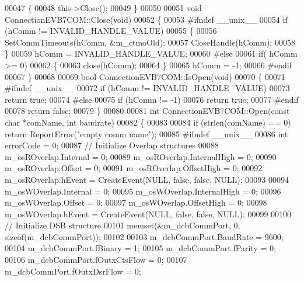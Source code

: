 \begin{DoxyCode}
00047 \{
00048     this->Close();
00049 \}
00050 
00051 \textcolor{keywordtype}{void} ConnectionEVB7COM::Close(\textcolor{keywordtype}{void})
00052 \{
00053 \textcolor{preprocessor}{#ifndef \_\_unix\_\_}
00054     \textcolor{keywordflow}{if} (hComm != INVALID\_HANDLE\_VALUE)
00055     \{
00056         SetCommTimeouts(hComm, &m_ctmoOld);
00057         CloseHandle(hComm);
00058     \}
00059     hComm = INVALID\_HANDLE\_VALUE;
00060 \textcolor{preprocessor}{#else}
00061     \textcolor{keywordflow}{if}( hComm >= 0)
00062     \{
00063         close(hComm);
00064     \}
00065     hComm = -1;
00066 \textcolor{preprocessor}{#endif}
00067 \}
00068 
00069 \textcolor{keywordtype}{bool} ConnectionEVB7COM::IsOpen(\textcolor{keywordtype}{void})
00070 \{
00071 \textcolor{preprocessor}{#ifndef \_\_unix\_\_}
00072     \textcolor{keywordflow}{if} (hComm != INVALID\_HANDLE\_VALUE)
00073         \textcolor{keywordflow}{return} \textcolor{keyword}{true};
00074 \textcolor{preprocessor}{#else}
00075     \textcolor{keywordflow}{if} (hComm != -1)
00076         \textcolor{keywordflow}{return} \textcolor{keyword}{true};
00077 \textcolor{preprocessor}{#endif}
00078     \textcolor{keywordflow}{return} \textcolor{keyword}{false};
00079 \}
00080 
00081 \textcolor{keywordtype}{int} ConnectionEVB7COM::Open(\textcolor{keyword}{const} \textcolor{keywordtype}{char} *comName, \textcolor{keywordtype}{int} baudrate)
00082 \{
00083 
00084     \textcolor{keywordflow}{if} (strlen(comName) == 0) \textcolor{keywordflow}{return} ReportError(\textcolor{stringliteral}{"empty comm name"});
00085 \textcolor{preprocessor}{#ifndef \_\_unix\_\_}
00086     \textcolor{keywordtype}{int} errorCode = 0;
00087     \textcolor{comment}{// Initialize Overlap structures}
00088     m_osROverlap.Internal = 0;
00089     m_osROverlap.InternalHigh = 0;
00090     m_osROverlap.Offset = 0;
00091     m_osROverlap.OffsetHigh = 0;
00092     m_osROverlap.hEvent = CreateEvent(NULL, \textcolor{keyword}{false}, \textcolor{keyword}{false}, NULL);
00093 
00094     m_osWOverlap.Internal = 0;
00095     m_osWOverlap.InternalHigh = 0;
00096     m_osWOverlap.Offset = 0;
00097     m_osWOverlap.OffsetHigh = 0;
00098     m_osWOverlap.hEvent = CreateEvent(NULL, \textcolor{keyword}{false}, \textcolor{keyword}{false}, NULL);
00099 
00100     \textcolor{comment}{// Initialize DSB structure}
00101     memset(&m_dcbCommPort, 0, \textcolor{keyword}{sizeof}(m_dcbCommPort));
00102 
00103     m_dcbCommPort.BaudRate = 9600;
00104     m_dcbCommPort.fBinary = 1;
00105     m_dcbCommPort.fParity = 0;
00106     m_dcbCommPort.fOutxCtsFlow = 0;
00107     m_dcbCommPort.fOutxDsrFlow = 0;

\end{DoxyCode}
